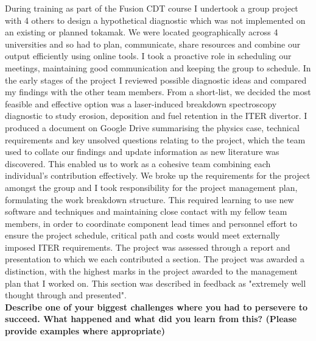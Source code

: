 \documentclass[11pt,a4paper,sans]{moderncv}        %
\begin{document}
During training as part of the Fusion CDT course I undertook a group project with 4 others to design a hypothetical diagnostic which was not implemented on an existing or planned tokamak. We were located geographically across 4 universities and so had to plan, communicate, share resources and combine our output efficiently using online tools.  I took a proactive role in scheduling our meetings, maintaining good communication and keeping the group to schedule. In the early stages of the project I reviewed possible diagnostic ideas and compared my findings with the other team members.  From a short-list, we decided the most feasible and effective option was a laser-induced breakdown spectroscopy diagnostic to study erosion, deposition and fuel retention in the ITER divertor. I produced a document on Google Drive summarising the physics case, technical requirements and key unsolved questions relating to the project, which the team used to collate our findings and update information as new literature was discovered. This enabled us to work as a cohesive team combining each individual's contribution effectively. We broke up the requirements for the project amongst the group and I took responsibility for the project management plan, formulating the work breakdown structure. This required learning to use new software and techniques and maintaining close contact with my fellow team members, in order to coordinate component lead times and personnel effort to ensure the project schedule, critical path and costs would meet externally imposed ITER requirements. The project was assessed through a report and presentation to which we each contributed a section. The project was awarded a distinction, with the highest marks in the project awarded to the management plan that I worked on. This section was described in feedback as "extremely     well     thought     through     and     presented".
\\

\textbf{Describe one of your biggest challenges where you had to persevere to succeed. What happened and what did you learn from this? (Please provide examples where appropriate)} 
\end{document}

